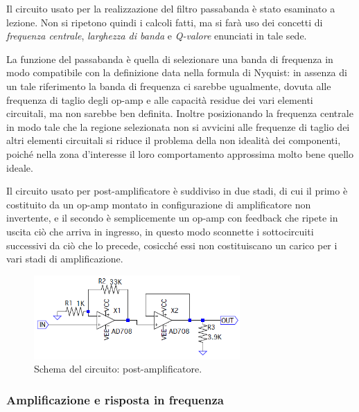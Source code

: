 \documentclass[a4paper,10pt]{article}
\begin{document}
Il circuito usato per la realizzazione del filtro passabanda è stato esaminato a lezione. Non si ripetono quindi i calcoli fatti, ma si farà uso dei concetti di \textit{frequenza centrale}, \textit{larghezza di banda} e \textit{Q-valore} enunciati in tale sede.

La funzione del passabanda è quella di selezionare una banda di frequenza in modo compatibile con la definizione data nella formula di Nyquist: in assenza di un tale riferimento la banda di frequenza ci sarebbe ugualmente, dovuta alle frequenza di taglio degli op-amp e alle capacità residue dei vari elementi circuitali, ma non sarebbe ben definita.
Inoltre posizionando la frequenza centrale in modo tale che la regione selezionata non si avvicini alle frequenze di taglio dei altri elementi circuitali si riduce il problema della non idealità dei componenti, poiché nella zona d'interesse il loro comportamento approssima molto bene quello ideale.
\newline

Il circuito usato per post-amplificatore è suddiviso in due stadi, di cui il primo è costituito da un op-amp montato in configurazione di amplificatore non invertente, e il secondo è semplicemente un op-amp con feedback che ripete in uscita ciò che arriva in ingresso, in questo modo sconnette i sottocircuiti successivi da ciò che lo precede, cosicché essi non costituiscano un carico per i vari stadi di amplificazione. 

\begin{figure}[H]
	\vspace{-10pt}
	\centering
	\includegraphics[width=0.7\textwidth]{../grafici/PostAmp.png}
	\vspace{-12pt}
	\caption{Schema del circuito: post-amplificatore.}
	\label{fig:postamp}
	\vspace{-6pt}
\end{figure}

\subsubsection*{Amplificazione e risposta in frequenza}
\end{document}
